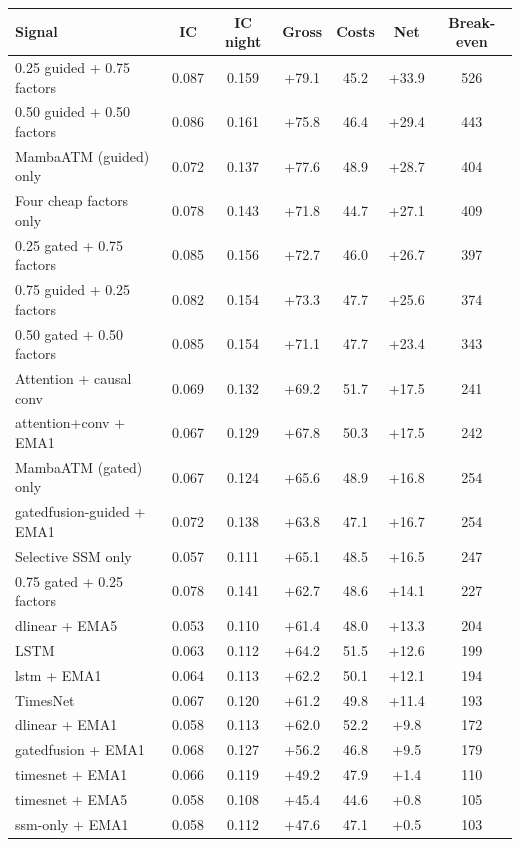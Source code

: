 {\scriptsize
\setlength{\tabcolsep}{2pt}
\begin{tabular}{lcccccc}
\toprule
\textbf{Signal} & \textbf{IC} & \textbf{IC night} & \textbf{Gross} & \textbf{Costs} & \textbf{Net} & \textbf{Break-even} \\
\midrule
0.25 guided + 0.75 factors & 0.087 & 0.159 & +79.1 & 45.2 & +33.9 & 526 \\
0.50 guided + 0.50 factors & 0.086 & 0.161 & +75.8 & 46.4 & +29.4 & 443 \\
MambaATM (guided) only & 0.072 & 0.137 & +77.6 & 48.9 & +28.7 & 404 \\
Four cheap factors only & 0.078 & 0.143 & +71.8 & 44.7 & +27.1 & 409 \\
0.25 gated + 0.75 factors & 0.085 & 0.156 & +72.7 & 46.0 & +26.7 & 397 \\
0.75 guided + 0.25 factors & 0.082 & 0.154 & +73.3 & 47.7 & +25.6 & 374 \\
0.50 gated + 0.50 factors & 0.085 & 0.154 & +71.1 & 47.7 & +23.4 & 343 \\
Attention + causal conv & 0.069 & 0.132 & +69.2 & 51.7 & +17.5 & 241 \\
attention+conv + EMA1 & 0.067 & 0.129 & +67.8 & 50.3 & +17.5 & 242 \\
MambaATM (gated) only & 0.067 & 0.124 & +65.6 & 48.9 & +16.8 & 254 \\
gatedfusion-guided + EMA1 & 0.072 & 0.138 & +63.8 & 47.1 & +16.7 & 254 \\
Selective SSM only & 0.057 & 0.111 & +65.1 & 48.5 & +16.5 & 247 \\
0.75 gated + 0.25 factors & 0.078 & 0.141 & +62.7 & 48.6 & +14.1 & 227 \\
dlinear + EMA5 & 0.053 & 0.110 & +61.4 & 48.0 & +13.3 & 204 \\
LSTM & 0.063 & 0.112 & +64.2 & 51.5 & +12.6 & 199 \\
lstm + EMA1 & 0.064 & 0.113 & +62.2 & 50.1 & +12.1 & 194 \\
TimesNet & 0.067 & 0.120 & +61.2 & 49.8 & +11.4 & 193 \\
dlinear + EMA1 & 0.058 & 0.113 & +62.0 & 52.2 & +9.8 & 172 \\
gatedfusion + EMA1 & 0.068 & 0.127 & +56.2 & 46.8 & +9.5 & 179 \\
timesnet + EMA1 & 0.066 & 0.119 & +49.2 & 47.9 & +1.4 & 110 \\
timesnet + EMA5 & 0.058 & 0.108 & +45.4 & 44.6 & +0.8 & 105 \\
ssm-only + EMA1 & 0.058 & 0.112 & +47.6 & 47.1 & +0.5 & 103 \\

\end{tabular}}
